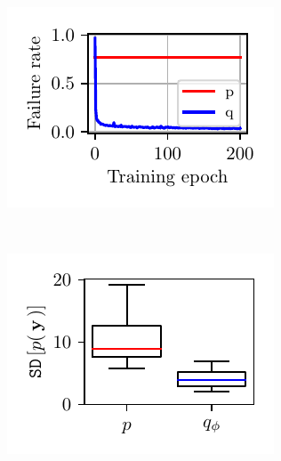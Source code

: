 \begin{figure}[h!]
    \begin{subfigure}[t]{0.24\textwidth}
        \includegraphics[width=\textwidth]{figures/RNF_cluster_2019_09_26_12_27_27/nf_bot_rate.pdf}
        \vspace*{-0.7cm}
        \caption{}
        \label{fig:ring:ar}
    \end{subfigure}%
    ~%
    \begin{subfigure}[t]{0.24\textwidth}
        \includegraphics[width=\textwidth]{figures/RNF_cluster_2019_09_26_12_27_27/smc_variance_plot.pdf}
        \vspace*{-0.7cm}
        \caption{}
        \label{fig:ring:smc:var}
    \end{subfigure}
\vspace*{-0.2cm}

\end{figure}
